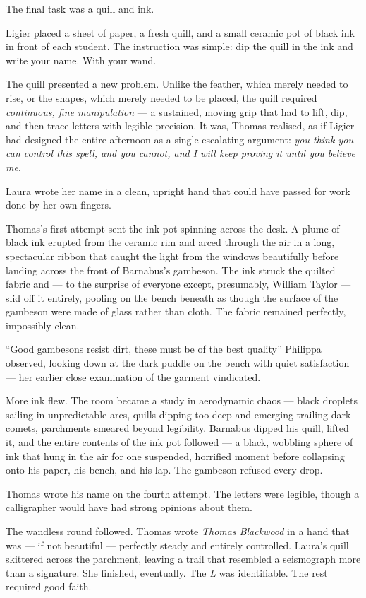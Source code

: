 The final task was a quill and ink.
 
Ligier placed a sheet of paper, a fresh quill, and a small ceramic pot of black ink in front of each student. The instruction was simple: dip the quill in the ink and write your name. With your wand.
 
The quill presented a new problem. Unlike the feather, which merely needed to rise, or the shapes, which merely needed to be placed, the quill required \textit{continuous, fine manipulation} --- a sustained, moving grip that had to lift, dip, and then trace letters with legible precision. It was, Thomas realised, as if Ligier had designed the entire afternoon as a single escalating argument: \textit{you think you can control this spell, and you cannot, and I will keep proving it until you believe me}.
 
Laura wrote her name in a clean, upright hand that could have passed for work done by her own fingers.
 
Thomas's first attempt sent the ink pot spinning across the desk. A plume of black ink erupted from the ceramic rim and arced through the air in a long, spectacular ribbon that caught the light from the windows beautifully before landing across the front of Barnabus's gambeson. The ink struck the quilted fabric and --- to the surprise of everyone except, presumably, William Taylor --- slid off it entirely, pooling on the bench beneath as though the surface of the gambeson were made of glass rather than cloth. The fabric remained perfectly, impossibly clean.
 
\enquote{Good gambesons resist dirt, these must be of the best quality} Philippa observed, looking down at the dark puddle on the bench with quiet satisfaction --- her earlier close examination of the garment vindicated.
 
More ink flew. The room became a study in aerodynamic chaos --- black droplets sailing in unpredictable arcs, quills dipping too deep and emerging trailing dark comets, parchments smeared beyond legibility. Barnabus dipped his quill, lifted it, and the entire contents of the ink pot followed --- a black, wobbling sphere of ink that hung in the air for one suspended, horrified moment before collapsing onto his paper, his bench, and his lap. The gambeson refused every drop.
 
Thomas wrote his name on the fourth attempt. The letters were legible, though a calligrapher would have had strong opinions about them.
 
The wandless round followed. Thomas wrote \textit{Thomas Blackwood} in a hand that was --- if not beautiful --- perfectly steady and entirely controlled. Laura's quill skittered across the parchment, leaving a trail that resembled a seismograph more than a signature. She finished, eventually. The \textit{L} was identifiable. The rest required good faith.
 
